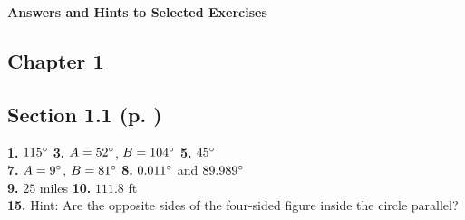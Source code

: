 \textsf{\textbf{\Large Answers and Hints to Selected Exercises}}
\begin{multicols}{2}
\section*{Chapter 1}
\subsection*{Section 1.1 (p. \pageref{sec1dot1})}
\textbf{1.} $115^\circ$ \quad \textbf{3.} $A=52^\circ$, $B=104^\circ$ \quad
\textbf{5.} $45^\circ$\\\textbf{7.} $A=9^\circ$, $B=81^\circ$ \quad
\textbf{8.} $0.011^\circ$ and $89.989^\circ$\\\textbf{9.} $25$ miles \quad \textbf{10.}
$111.8$ ft\\\textbf{15.} Hint: Are the opposite sides of the four-sided figure inside the circle
parallel?

\end{multicols}
